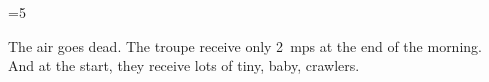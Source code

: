 \ifnum\value{cycle}=5


The air goes dead.
The troupe receive only 2~\glspl{mp} at the end of the morning.
And at the start, they receive lots of tiny, baby, \glspl{crawler}.

\crawlerSwarm

\fi
